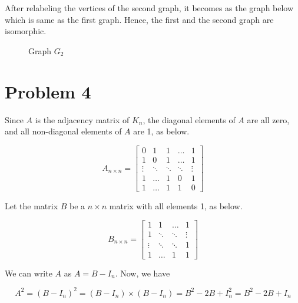 \documentclass{article}
\begin{document}
After relabeling the vertices of the second graph, it becomes as the graph below which is same as the first graph. Hence, the first and the second graph are isomorphic.

\begin{figure}[H]
\centering
{}
\caption{Graph $G_2$}
\end{figure}

\section*{Problem 4}
		
Since $A$ is the adjacency matrix of $K_n$, the diagonal elements of $A$ are all zero, and all non-diagonal elements of $A$ are 1, as below.

\[A_{n\times n}=\begin{bmatrix}
  0&1&1&\hdots&1 \\
  1&0&1&\hdots&1\\
   \vdots& \ddots & \ddots & \ddots &\vdots\\
  1&\hdots&1&0&1\\
  1&\hdots&1&1&0
  \end{bmatrix}\]

  Let the matrix $B$ be a $n\times n$ matrix with all elements 1, as below.

  \[B_{n\times n}=\begin{bmatrix}
 1&1&\hdots&1 \\
  1&\ddots&\ddots&\vdots\\
   \vdots& \ddots & \ddots & 1\\
  1&\hdots&1&1
  \end{bmatrix}\]

  We can write $A$ as $A=B-I_n$. Now, we have

  $$A^2=(B-I_n)^2=(B-I_n)\times (B-I_n)=B^2-2B+I_n^2=B^2-2B+I_n$$
\end{document}
